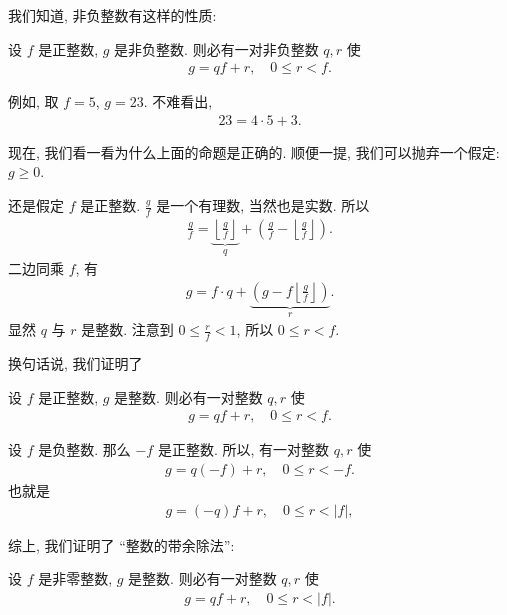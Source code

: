 我们知道, 非负整数有这样的性质:

\begin{proposition}
    设 $f$ 是正整数, $g$ 是非负整数. 则必有一对非负整数 $q,r$ 使
    \begin{align*}
        g = qf + r, \quad 0 \leq r < f.
    \end{align*}
\end{proposition}

例如, 取 $f=5$, $g=23$. 不难看出,
\begin{align*}
    23 = 4 \cdot 5 + 3.
\end{align*}

现在, 我们看一看为什么上面的命题是正确的. 顺便一提, 我们可以抛弃一个假定: $g \geq 0$.

还是假定 $f$ 是正整数. $\frac{g}{f}$ 是一个有理数, 当然也是实数. 所以
\begin{align*}
    \frac{g}{f} = \underbrace{\left\lfloor \frac{g}{f} \right\rfloor}_{q} + \left( \frac{g}{f} - \left\lfloor \frac{g}{f} \right\rfloor \right).
\end{align*}
二边同乘 $f$, 有
\begin{align*}
    g = f \cdot q + \underbrace{\left( g - f\left\lfloor \frac{g}{f} \right\rfloor \right)}_{r}.
\end{align*}
显然 $q$ 与 $r$ 是整数. 注意到 $0 \leq \frac{r}{f} < 1$, 所以 $0 \leq r < f$.

换句话说, 我们证明了
\begin{proposition}
    设 $f$ 是正整数, $g$ 是整数. 则必有一对整数 $q,r$ 使
    \begin{align*}
        g = qf + r, \quad 0 \leq r < f.
    \end{align*}
\end{proposition}

设 $f$ 是负整数. 那么 $-f$ 是正整数. 所以, 有一对整数 $q,r$ 使
\begin{align*}
    g = q(-f) + r, \quad 0 \leq r < -f.
\end{align*}
也就是
\begin{align*}
    g = (-q)f + r, \quad 0 \leq r < |f|,
\end{align*}

综上, 我们证明了 ``整数的带余除法'':
\begin{proposition}
    设 $f$ 是非零整数, $g$ 是整数. 则必有一对整数 $q,r$ 使
    \begin{align*}
        g = qf + r, \quad 0 \leq r < |f|.
    \end{align*}
\end{proposition}

